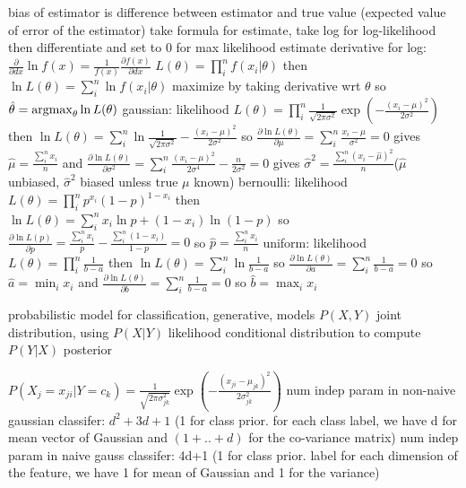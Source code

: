 \documentclass[10pt]{article}
\begin{document}
\NEW bias of estimator is difference between estimator and true value (expected value of error of the estimator)
\NEW take formula for estimate, take log for log-likelihood then differentiate and set to 0 for max likelihood estimate
\NEW derivative for log: $\frac{\partial }{\partial dx} \ln f(x) = \frac{1}{f(x)} \frac{\partial f(x)}{\partial dx}$
\NEW $L(\theta) = \prod_i^n f(x_i|\theta)$ then $\ln L(\theta) = \sum_i^n \ln f(x_i|\theta)$
\NEW maximize by taking derivative wrt $\theta$ so $\hat{\theta} = \mathrm{argmax}_\theta \ln L(\theta)$
\NEW gaussian: likelihood $L(\theta) = \prod_i^n \frac{1}{\sqrt{2\pi\sigma^2}} \exp\left(-\frac{(x_i-\mu)^2}{2\sigma^2}\right)$ then $\ln L(\theta) = \sum_i^n \ln \frac{1}{\sqrt{2\pi\sigma^2}} - \frac{(x_i-\mu)^2}{2\sigma^2}$ so $\frac{\partial \ln L(\theta)}{\partial \mu} = \sum_i^n \frac{x_i-\mu}{\sigma^2} = 0$ gives $\hat{\mu} = \frac{\sum_i^n x_i}{n}$ and $\frac{\partial \ln L(\theta)}{\partial \sigma^2} = \sum_i^n \frac{(x_i-\mu)^2}{2\sigma^4} - \frac{n}{2\sigma^2} = 0$ gives $\hat{\sigma}^2 = \frac{\sum_i^n (x_i-\hat{\mu})^2}{n}$($\hat{\mu}$ unbiased, $\hat{\sigma}^2$ biased unless true $\mu$ known)
\NEW bernoulli: likelihood $L(\theta) = \prod_i^n p^{x_i} (1-p)^{1-x_i}$ then $\ln L(\theta) = \sum_i^n x_i \ln p + (1-x_i) \ln (1-p)$ so $\frac{\partial \ln L(p)}{\partial p} = \frac{\sum_i^n x_i}{p} - \frac{\sum_i^n (1-x_i)}{1-p} = 0$ so $\hat{p} = \frac{\sum_i^n x_i}{n}$
\NEW uniform: likelihood $L(\theta) = \prod_i^n \frac{1}{b-a}$ then $\ln L(\theta) = \sum_i^n \ln \frac{1}{b-a}$ so $\frac{\partial \ln L(\theta)}{\partial a} = \sum_i^n \frac{1}{b-a} = 0$ so $\hat{a} = \min_i x_i$ and $\frac{\partial \ln L(\theta)}{\partial b} = \sum_i^n \frac{1}{b-a} = 0$ so $\hat{b} = \max_i x_i$

\NEW probabilistic model for classification, generative, models $P(X,Y)$ joint distribution, using $P(X|Y)$ likelihood conditional distribution to compute $P(Y|X)$ posterior

 $P(X_j=x_{ji}|Y=c_k) = \frac{1}{\sqrt{2\pi\sigma_{jk}^2}} \exp\left(-\frac{(x_{ji}-\mu_{jk})^2}{2\sigma_{jk}^2}\right)$
\NEW num indep param in non-naive gaussian classifer: $d^2 +3d+1$ (1 for class prior. for each class label, we have d for mean vector of Gaussian and $(1 + .. + d)$ for the co-variance matrix)
\NEW num indep param in naive gauss classifer: 4d+1 (1 for class prior.  label for each dimension of the feature, we have 1 for mean of Gaussian and 1 for the variance)
\end{document}
